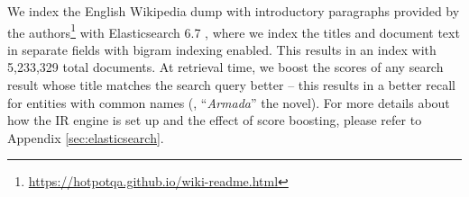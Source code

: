 We index the English Wikipedia dump with introductory paragraphs provided by the \hotpotqa{} authors\footnote{\url{https://hotpotqa.github.io/wiki-readme.html}} with Elasticsearch 6.7 \cite{gormley2015elasticsearch},
where we index the titles and document text in separate fields with bigram indexing enabled.
This results in an index with 5,233,329 total documents.
At retrieval time, we boost the scores of any search result whose title matches the search query better -- this results in a better recall for entities with common names (\eg, ``\emph{Armada}'' the novel).
For more details about how the IR engine is set up and the effect of score boosting, please refer to Appendix \ref{sec:elasticsearch}.

\begin{figure}
    \questionpone

\questionptwo

\oraclepone

\oracleptwo


\end{figure}

